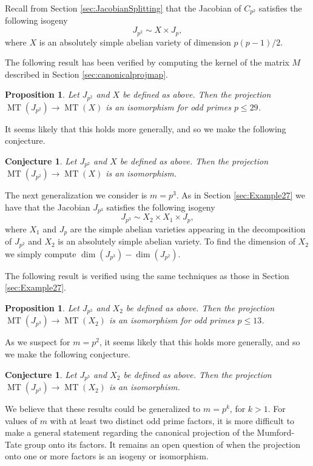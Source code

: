 \documentclass[reqno, oneside, 12pt]{amsart}
\DeclareMathOperator{\MT}{MT}
\newtheorem{proposition}[theorem]{Proposition}
\newtheorem{conjecture}[theorem]{Conjecture}
\theoremstyle{remark}
\numberwithin{equation}{section}
\begin{document}
Recall from Section \ref{sec:JacobianSplitting} that the Jacobian of $C_{p^2}$ satisfies the following isogeny
$$J_{p^2} \sim  X \times J_p,$$
where $X$ is an absolutely simple abelian variety of dimension $p(p-1)/2$.

The following result has been verified by computing the kernel of the matrix $M$ described in Section \ref{sec:canonicalprojmap}.
\begin{proposition}\label{prop:MTp2}
Let $J_{p^2}$ and $X$ be defined as above. Then the projection $\MT(J_{p^2})\rightarrow \MT(X)$ is an isomorphism for odd primes $p\leq 29$.
\end{proposition}

It seems likely that this holds more generally, and so we make the following conjecture.
\begin{conjecture}\label{conjec:MTp2}
Let $J_{p^2}$ and $X$ be defined as above. Then the projection $\MT(J_{p^2})\rightarrow \MT(X)$ is an isomorphism.
\end{conjecture}

The next generalization we consider is $m=p^3$. As in Section  \ref{sec:Example27} we have that the Jacobian $J_{p^3}$ satisfies the following isogeny
$$J_{p^3} \sim  X_2 \times X_1 \times J_p,$$
where $X_1$ and $J_p$ are the simple abelian varieties appearing in the decomposition of $J_{p^2}$ and $X_2$ is an absolutely simple abelian variety. To find the dimension of $X_2$ we simply compute $\dim(J_{p^3})-\dim(J_{p^2})$. 

The following result is verified using the same techniques as those in Section \ref{sec:Example27}.
\begin{proposition}\label{prop:MTp3}
Let $J_{p^3}$ and $X_2$ be defined as above. Then the projection $\MT(J_{p^3})\rightarrow \MT(X_2)$ is an isomorphism for odd primes $p\leq 13$.
\end{proposition}

As we suspect for $m=p^2$, it seems likely that this holds more generally, and so we make the following conjecture.
\begin{conjecture}\label{conjec:MTp3}
Let $J_{p^3}$ and $X_2$ be defined as above. Then the projection $\MT(J_{p^3})\rightarrow \MT(X_2)$ is an isomorphism.
\end{conjecture}

We believe that these results could be generalized to $m=p^k$, for $k>1$. For values of $m$ with at least two distinct odd prime factors, it is more difficult to make a general statement regarding the canonical projection of the Mumford-Tate group onto its factors. It remains an open question of when the projection onto one or more factors is an isogeny or isomorphism.
\end{document}
